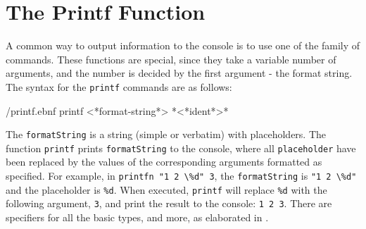 \section{The Printf Function}
\label{sec:printf}
A common way to output information to the console is to use one of the family of  commands. These functions are special, since they take a variable number of arguments, and the number is decided by the first argument - the format string. The syntax for the \lstinline{printf} commands are as follows:
%
\begin{verbatimwrite}{\ebnf/printf.ebnf}
printf <*format-string*> {*<*ident*>*}
\end{verbatimwrite}
%
The \lstinline[language=ebnf]!formatString! is a string (simple or verbatim) with placeholders. The function \lstinline[language=ebnf]!printf! prints \lstinline[language=ebnf]!formatString! to the console, where all \lstinline[language=ebnf]!placeholder! have been replaced by the values of the corresponding arguments formatted as specified. For example, in \mbox{\lstinline!printfn "1 2 \%d" 3!}, the \lstinline[language=ebnf]!formatString! is \mbox{\lstinline!"1 2 \%d"!} and the placeholder is \lstinline!%d!. %
When executed, \lstinline{printf} will replace \lstinline!%d! %
with the following argument, \lstinline{3}, and print the result to the console: \mbox{\lstinline!1 2 3!}.  There are specifiers for all the basic types, and more, as elaborated in .
% 
